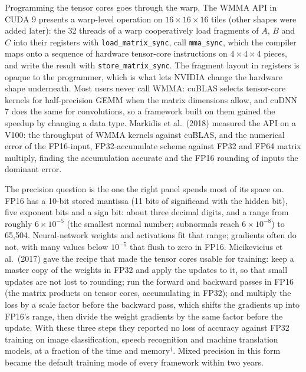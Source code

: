 \documentclass[11pt,letterpaper]{article}
\begin{document}
Programming the tensor cores goes through the warp. The WMMA API in CUDA 9 presents a warp-level operation on $16\times16\times16$ tiles (other shapes were added later): the 32 threads of a warp cooperatively load fragments of $A$, $B$ and $C$ into their registers with \texttt{load\_matrix\_sync}, call \texttt{mma\_sync}, which the compiler maps onto a sequence of hardware tensor-core instructions on $4\times4\times4$ pieces, and write the result with \texttt{store\_matrix\_sync}. The fragment layout in registers is opaque to the programmer, which is what lets NVIDIA change the hardware shape underneath. Most users never call WMMA: cuBLAS selects tensor-core kernels for half-precision GEMM when the matrix dimensions allow, and cuDNN 7 does the same for convolutions, so a framework built on them gained the speedup by changing a data type. Markidis et al.\ (2018) measured the API on a V100: the throughput of WMMA kernels against cuBLAS, and the numerical error of the FP16-input, FP32-accumulate scheme against FP32 and FP64 matrix multiply, finding the accumulation accurate and the FP16 rounding of inputs the dominant error.

The precision question is the one the right panel spends most of its space on. FP16 has a 10-bit stored mantissa (11 bits of significand with the hidden bit), five exponent bits and a sign bit: about three decimal digits, and a range from roughly $6 \times 10^{-5}$ (the smallest normal number; subnormals reach $6\times10^{-8}$) to 65,504. Neural-network weights and activations fit that range; gradients often do not, with many values below $10^{-5}$ that flush to zero in FP16. Micikevicius et al.\ (2017) gave the recipe that made the tensor cores usable for training: keep a master copy of the weights in FP32 and apply the updates to it, so that small updates are not lost to rounding; run the forward and backward passes in FP16 (the matrix products on tensor cores, accumulating in FP32); and multiply the loss by a scale factor before the backward pass, which shifts the gradients up into FP16's range, then divide the weight gradients by the same factor before the update. With these three steps they reported no loss of accuracy against FP32 training on image classification, speech recognition and machine translation models, at a fraction of the time and memory$^\dagger$. Mixed precision in this form became the default training mode of every framework within two years.
\end{document}
